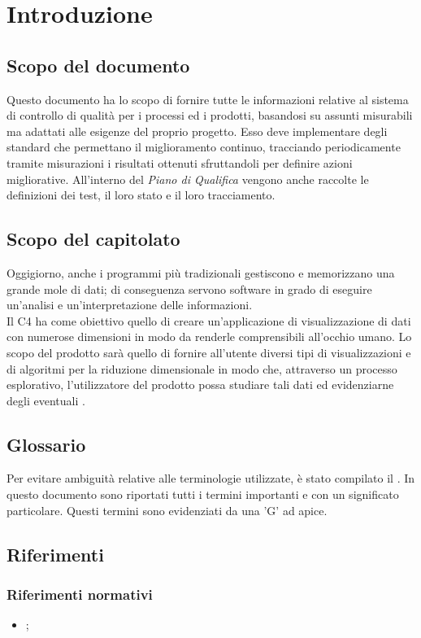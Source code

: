 \section{Introduzione}
\subsection{Scopo del documento}
Questo documento ha lo scopo di fornire tutte le informazioni relative al sistema di controllo di qualità per i processi ed i prodotti, basandosi su assunti misurabili ma adattati alle esigenze del proprio progetto.
Esso deve implementare degli standard che permettano il miglioramento continuo, tracciando periodicamente tramite misurazioni i risultati ottenuti sfruttandoli per definire azioni migliorative. All'interno del \textit{Piano di Qualifica} vengono anche raccolte le definizioni dei test, il loro stato e il loro tracciamento. 

\subsection{Scopo del capitolato}
Oggigiorno, anche i programmi più tradizionali gestiscono e memorizzano una grande mole di dati; di conseguenza servono software in grado di eseguire un'analisi e un'interpretazione delle informazioni.\\
Il  C4 ha come obiettivo quello di creare un'applicazione di visualizzazione di dati con numerose dimensioni in modo da renderle comprensibili all'occhio umano.  Lo scopo del prodotto sarà quello di fornire all'utente diversi tipi di visualizzazioni e di algoritmi per la riduzione dimensionale in modo che, attraverso un processo esplorativo, l'utilizzatore del prodotto possa studiare tali dati ed evidenziarne degli eventuali . 

\subsection{Glossario}
Per evitare ambiguità relative alle terminologie utilizzate, è stato compilato il . In questo documento sono riportati tutti i termini importanti e con un significato particolare. Questi termini sono evidenziati da una 'G' ad apice.

\subsection{Riferimenti}
\subsubsection{Riferimenti normativi}
\begin{itemize}	
\item \textbf{};
	
\end{itemize}

